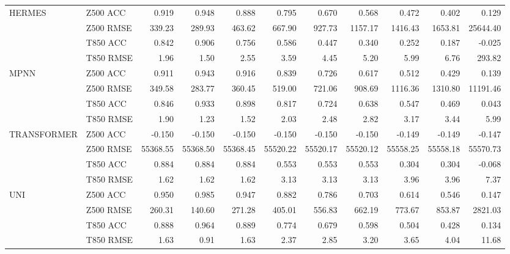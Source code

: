 \begin{table}[htbp]
{\begin{tabular}{llrrrrrrrrr}
\midrule
\multirow{4}{*}{HERMES} & Z500 ACC & 0.919 & 0.948 & 0.888 & 0.795 & 0.670 & 0.568 & 0.472 & 0.402 & 0.129 \\
 & Z500 RMSE & 339.23 & 289.93 & 463.62 & 667.90 & 927.73 & 1157.17 & 1416.43 & 1653.81 & 25644.40 \\
 & T850 ACC & 0.842 & 0.906 & 0.756 & 0.586 & 0.447 & 0.340 & 0.252 & 0.187 & -0.025 \\
 & T850 RMSE & 1.96 & 1.50 & 2.55 & 3.59 & 4.45 & 5.20 & 5.99 & 6.76 & 293.82 \\
\midrule
\multirow{4}{*}{MPNN} & Z500 ACC & 0.911 & 0.943 & 0.916 & 0.839 & 0.726 & 0.617 & 0.512 & 0.429 & 0.139 \\
 & Z500 RMSE & 349.58 & 283.77 & 360.45 & 519.00 & 721.06 & 908.69 & 1116.36 & 1310.80 & 11191.46 \\
 & T850 ACC & 0.846 & 0.933 & 0.898 & 0.817 & 0.724 & 0.638 & 0.547 & 0.469 & 0.043 \\
 & T850 RMSE & 1.90 & 1.23 & 1.52 & 2.03 & 2.48 & 2.82 & 3.17 & 3.44 & 5.99 \\
\midrule
\multirow{4}{*}{TRANSFORMER} & Z500 ACC & -0.150 & -0.150 & -0.150 & -0.150 & -0.150 & -0.150 & -0.149 & -0.149 & -0.147 \\
 & Z500 RMSE & 55368.55 & 55368.50 & 55368.45 & 55520.22 & 55520.17 & 55520.12 & 55558.25 & 55558.18 & 55570.73 \\
 & T850 ACC & 0.884 & 0.884 & 0.884 & 0.553 & 0.553 & 0.553 & 0.304 & 0.304 & -0.068 \\
 & T850 RMSE & 1.62 & 1.62 & 1.62 & 3.13 & 3.13 & 3.13 & 3.96 & 3.96 & 7.37 \\
\midrule
\multirow{4}{*}{UNI} & Z500 ACC & 0.950 & 0.985 & 0.947 & 0.882 & 0.786 & 0.703 & 0.614 & 0.546 & 0.147 \\
 & Z500 RMSE & 260.31 & 140.60 & 271.28 & 405.01 & 556.83 & 662.19 & 773.67 & 853.87 & 2821.03 \\
 & T850 ACC & 0.888 & 0.964 & 0.889 & 0.774 & 0.679 & 0.598 & 0.504 & 0.428 & 0.134 \\
 & T850 RMSE & 1.63 & 0.91 & 1.63 & 2.37 & 2.85 & 3.20 & 3.65 & 4.04 & 11.68 \\
\bottomrule
\end{tabular}%
}
\end{table}